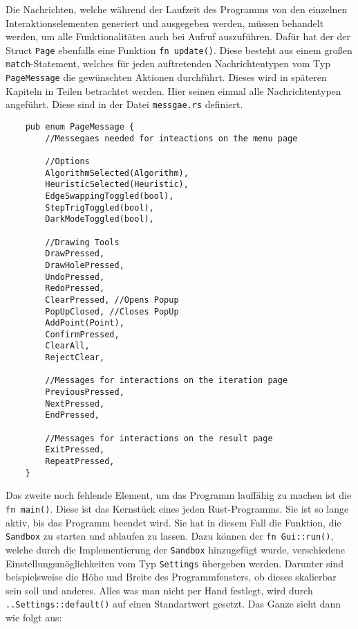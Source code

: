Die Nachrichten, welche während der Laufzeit des Programms von den einzelnen Interaktionselementen generiert und ausgegeben werden, müssen behandelt werden, um alle Funktionalitäten auch bei Aufruf auszuführen.
Dafür hat der der Struct \lstinline{Page} ebenfalls eine Funktion \lstinline{fn update()}. Diese besteht aus einem großen \lstinline{match}-Statement, welches für jeden auftretenden Nachrichtentypen vom Typ \lstinline{PageMessage} die gewünschten 
Aktionen durchführt. Dieses wird in späteren Kapiteln in Teilen betrachtet werden. Hier seinen einmal alle Nachrichtentypen angeführt. Diese sind in der Datei \lstinline{messgae.rs} definiert.

\begin{lstlisting}
    pub enum PageMessage {
        //Messegaes needed for inteactions on the menu page
        
        //Options
        AlgorithmSelected(Algorithm),
        HeuristicSelected(Heuristic),
        EdgeSwappingToggled(bool),
        StepTrigToggled(bool),
        DarkModeToggled(bool),
    
        //Drawing Tools
        DrawPressed,
        DrawHolePressed,
        UndoPressed,
        RedoPressed,
        ClearPressed, //Opens Popup
        PopUpClosed, //Closes PopUp
        AddPoint(Point),
        ConfirmPressed,
        ClearAll,
        RejectClear,
        
        //Messages for interactions on the iteration page
        PreviousPressed,
        NextPressed,
        EndPressed,
    
        //Messages for interactions on the result page
        ExitPressed,
        RepeatPressed,
    }
\end{lstlisting}

Das zweite noch fehlende Element, um das Programm lauffähig zu machen ist die \lstinline{fn main()}. Diese ist das Kernstück eines jeden Rust-Programms. Sie ist so lange aktiv, bis das Programm beendet wird.
Sie hat in diesem Fall die Funktion, die \lstinline{Sandbox} zu starten und ablaufen zu lassen. Dazu können der \lstinline{fn Gui::run()}, welche durch die Implementierung der \lstinline{Sandbox} hinzugefügt wurde, verschiedene 
Einstellungsmöglichkeiten vom Typ \lstinline{Settings} übergeben werden. Darunter sind beispielsweise die Höhe und Breite des Programmfensters, ob dieses skalierbar sein soll und anderes. Alles was man nicht per Hand festlegt,
wird durch \lstinline{..Settings::default()} auf einen Standartwert gesetzt. Das Ganze sieht dann wie folgt aus: 

